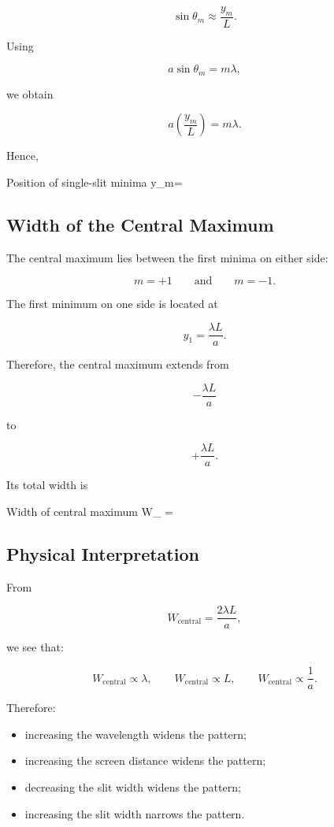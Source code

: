 \documentclass{studentnotes}
\begin{document}
\[
    \sin\theta_m\approx\frac{y_m}{L}.
\]

Using

\[
    a\sin\theta_m=m\lambda,
\]

we obtain

\[
    a\left(\frac{y_m}{L}\right)=m\lambda.
\]

Hence,

\begin{namedformula}{Position of single-slit minima}
    y_m=
\end{namedformula}

\subsection{Width of the Central Maximum}

The central maximum lies between the first minima on either side:

\[
    m=+1
    \qquad\text{and}\qquad
    m=-1.
\]

The first minimum on one side is located at

\[
    y_1=\frac{\lambda L}{a}.
\]

Therefore, the central maximum extends from

\[
    -\frac{\lambda L}{a}
\]

to

\[
    +\frac{\lambda L}{a}.
\]

Its total width is

\begin{namedformula}{Width of central maximum}
    W_{}
    =
\end{namedformula}

\subsection{Physical Interpretation}

From

\[
    W_{\text{central}}
    =
    \frac{2\lambda L}{a},
\]

we see that:

\[
    W_{\text{central}}\propto\lambda,
    \qquad
    W_{\text{central}}\propto L,
    \qquad
    W_{\text{central}}\propto\frac{1}{a}.
\]

Therefore:

\begin{itemize}
    \item increasing the wavelength widens the pattern;
    \item increasing the screen distance widens the pattern;
    \item decreasing the slit width widens the pattern;
    \item increasing the slit width narrows the pattern.
\end{itemize}
\end{document}
